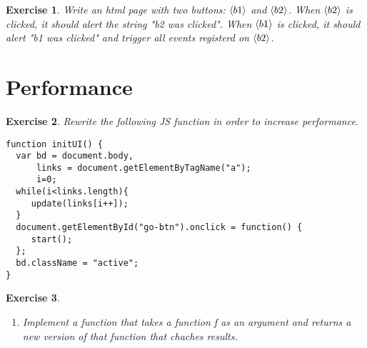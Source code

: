 \documentclass{article}
\newtheorem{ex}{Exercise}[section]
\begin{document}
\begin{ex} 
Write an html page with two buttons: $\langle b1\rangle$ and $\langle b2\rangle$. When $\langle b2\rangle$
is clicked, it should alert the string "b2 was clicked". When $\langle b1\rangle$ is clicked, 
it should alert "b1 was clicked" and trigger all events registerd on $\langle b2\rangle$. 
\end{ex}

\section{Performance}

\begin{ex}
Rewrite the following JS function in order to increase performance. 
\begin{verbatim}
function initUI() { 
  var bd = document.body, 
      links = document.getElementByTagName("a"); 
      i=0; 
  while(i<links.length){
     update(links[i++]); 
  }
  document.getElementById("go-btn").onclick = function() { 
     start(); 
  };
  bd.className = "active";  
}
\end{verbatim}
\end{ex}


\begin{ex}
\begin{enumerate}
  \item Implement a function that takes a function f as an argument and 
        returns a new version of that function that chaches results.  
\end{enumerate}
\end{ex}
\end{document}
